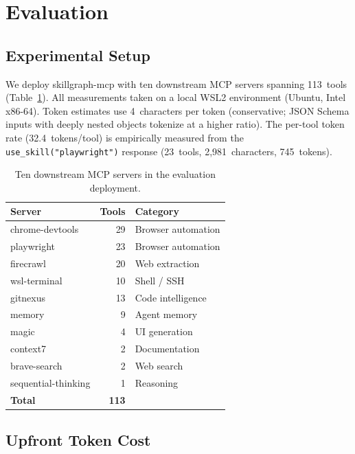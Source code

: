 \documentclass[11pt,a4paper]{article}
\begin{document}
\section{Evaluation}
\label{sec:eval}

\subsection{Experimental Setup}

We deploy skillgraph-mcp with ten downstream MCP servers spanning 113~tools
(Table~\ref{tab:servers}). All measurements taken on a local WSL2 environment
(Ubuntu, Intel x86-64). Token estimates use 4~characters per token (conservative;
JSON Schema inputs with deeply nested objects tokenize at a higher ratio). The
per-tool token rate (32.4~tokens/tool) is empirically measured from the
\texttt{use\_skill("playwright")} response (23~tools, 2,981~characters, 745~tokens).

\begin{table}[h]
\centering
\small
\begin{tabular}{lrl}
\toprule
\textbf{Server} & \textbf{Tools} & \textbf{Category} \\
\midrule
chrome-devtools    & 29 & Browser automation \\
playwright         & 23 & Browser automation \\
firecrawl          & 20 & Web extraction \\
wsl-terminal       & 10 & Shell / SSH \\
gitnexus           & 13 & Code intelligence \\
memory             &  9 & Agent memory \\
magic              &  4 & UI generation \\
context7           &  2 & Documentation \\
brave-search       &  2 & Web search \\
sequential-thinking &  1 & Reasoning \\
\midrule
\textbf{Total}     & \textbf{113} & \\
\bottomrule
\end{tabular}
\caption{Ten downstream MCP servers in the evaluation deployment.}
\label{tab:servers}
\end{table}

\subsection{Upfront Token Cost}
\end{document}
